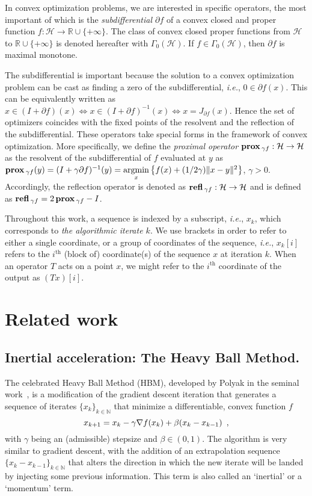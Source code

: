 \documentclass[envcountsect]{svjour3}
\newcommand{\argmin}{\operatorname{ argmin}}
\newcommand{\ie}{{\it i.e.}}
\newcommand{\reals}{{\mathbb{R} }}
\newcommand{\Hil}{{\mathcal{H} }}
\newcommand{\N}{{\mathbb{N} }}
\newcommand{\prox}{\operatorname{\bf prox}}
\newcommand{\refl}{\operatorname{\bf refl}}
\begin{document}
In convex optimization problems, we are interested in specific operators, the most important of which is the \emph{subdifferential $\partial f$} of a convex closed and proper function $f: \Hil\to\reals\cup\{+\infty\}$. The class of convex closed proper functions from $\Hil$ to $\reals\cup\{+\infty\}$ is denoted hereafter with $\Gamma_0(\Hil)$. If $f\in\Gamma_0(\Hil)$, then $\partial f$ is maximal monotone.

The subdifferential is important because the solution to a convex optimization problem can be cast as finding a zero of the subdifferential, \ie, $0\in\partial f(x)$. This can be equivalently written as $x\in(I+\partial f)(x)\Leftrightarrow x\in(I+\partial f)^{-1}(x)\Leftrightarrow x=J_{\partial f}(x)$. Hence the set of optimizers coincides with the fixed points of the resolvent and the reflection of the subdifferential. These operators take special forms in the framework of convex optimization. More specifically, we define the \emph{proximal operator} $\prox{_{\gamma f}}:\Hil\to\Hil$ as the resolvent of the subdifferential of $f$ evaluated at $y$ as $\prox{_{\gamma f}}(y)=(I+\gamma\partial f)^{-1}(y)=\underset{x}{\argmin}\left\{f(x)+(1/2\gamma)\|x-y\|^2\right\}$, $\gamma>0$. Accordingly, the reflection operator is denoted as $\refl{_{\gamma f}}:\Hil\to\Hil$ and is defined as $\refl{_{\gamma f}}=2\prox{_{\gamma f}}-I$.

Throughout this work, a sequence is indexed by a subscript, \ie, $x_{k}$, which corresponds to \emph{the algorithmic iterate $k$}. We use brackets in order to refer to either a single coordinate, or a group of coordinates of the sequence, \ie, $x_k[i]$ refers to the $i^\mathrm{th}$ (block of) coordinate(s) of the sequence $x$ at iteration $k$. When an operator $T$ acts on a point $x$, we might refer to the $i^\mathrm{th}$ coordinate of the output as $(Tx)[i]$.

\section{Related work}\label{sec::related} %

\subsection{Inertial acceleration: The Heavy Ball Method. }\label{ssec::HBM} %
The celebrated Heavy Ball Method (HBM), developed by Polyak in the seminal work~\cite{PolyakHBM}, is a modification of the gradient descent iteration that generates a sequence of iterates $\{x_k\}_{k\in\N}$ that minimize a differentiable, convex function $f$
\begin{equation}{\label{eq::HBM}}
 x_{k+1} = x_k - \gamma\nabla f(x_k) + \beta(x_k-x_{k-1})\enspace,
\end{equation}
with $\gamma$ being an (admissible) stepsize and $\beta\in(0,1)$.
The algorithm is very similar to gradient descent, with the addition of an extrapolation sequence $\{x_k-x_{k-1}\}_{k\in\N}$ that alters the direction in which the new iterate will be landed by injecting some previous information. This term is also called an `inertial' or a `momentum' term.
\end{document}
